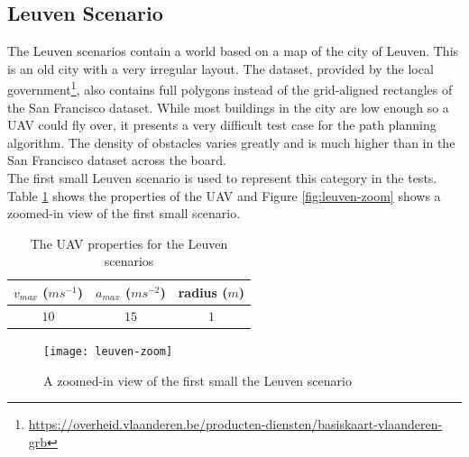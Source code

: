 \subsection{Leuven Scenario}
\label{subsec:leuven}
The Leuven scenarios contain a world based on a map of the city of Leuven. This is an old city with a very irregular layout. The dataset, provided by the local government\footnote{\url{https://overheid.vlaanderen.be/producten-diensten/basiskaart-vlaanderen-grb}}, also contains full polygons instead of the grid-aligned rectangles of the San Francisco dataset. While most buildings in the city are low enough so a UAV could fly over, it presents a very difficult test case for the path planning algorithm. The density of obstacles varies greatly and is much higher than in the San Francisco dataset across the board.\\
The first small Leuven scenario is used to represent this category in the tests. Table \ref{table:uav-leuven} shows the properties of the UAV and Figure \ref{fig:leuven-zoom} shows a zoomed-in view of the first small scenario. 
\begin{table}[h]
\centering
\begin{tabular}{ c | c | c }
$v_{max}$ ($ms^{-1}$)	& $a_{max}$ ($ms^{-2}$) 	& radius ($m$) 	 \\
\hline
$10$ & $15$ 	& $1$ \\
\end{tabular}
\caption{The UAV properties for the Leuven scenarios}
\label{table:uav-leuven}
\end{table}

\begin{figure}[h]
	\centering
	\texttt{[image: leuven-zoom]}
	\caption{A zoomed-in view of the first small the Leuven scenario}
	\label{fig:sf-zoom}
\end{figure}



